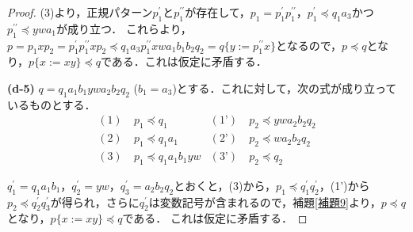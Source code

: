 \begin{proof}
(3)より，正規パターン$p_{1}^{\prime}$と$p_{1}^{\prime\prime}$が存在して，$p_{1}=p_{1}^{\prime}p_{1}^{\prime\prime}$，$p_{1}^{\prime} \preceq q_{1}a_{3}$かつ$p_{1}^{\prime\prime} \preceq ywa_{1}$が成り立つ．
これらより，$p=p_{1}xp_{2}=p_{1}^{\prime}p_{1}^{\prime\prime}xp_{2}\preceq q_{1}a_{3}p_{1}^{\prime\prime}xwa_{1}b_{1}b_{2}q_{2}=q \{ y := p_{1}^{\prime\prime}x \}$となるので，$p \preceq q$となり，$p \{ x := xy \} \preceq q$である．これは仮定に矛盾する．
\smallskip

\textbf{(d-5)} $q=q_{1}a_{1}b_{1}ywa_{2}b_{2}q_{2}$ ($b_{1}=a_{3}$)とする．これに対して，次の式が成り立っているものとする．
\begin{align*}
(1)~& p_{1} \preceq q_{1} & (\text{1'})~& p_{2} \preceq ywa_{2}b_{2}q_{2} \\
(2)~& p_{1} \preceq q_{1}a_{1} & (\text{2'})~& p_{2} \preceq wa_{2}b_{2}q_{2} \\
(3)~& p_{1} \preceq q_{1}a_{1}b_{1}yw & (\text{3'})~& p_{2} \preceq q_{2}
\end{align*}

$q_{1}^{\prime}=q_{1}a_{1}b_{1}$，$q_{2}^{\prime}=yw$，$q_{3}^{\prime}=a_{2}b_{2}q_{2}$とおくと，(3)から，$p_{1} \preceq q_{1}^{\prime}q_{2}^{\prime}$，(1')から$p_{2} \preceq q_{2}^{\prime}q_{3}^{\prime}$が得られ，さらに$q_{2}^{\prime}$は変数記号が含まれるので，補題\ref{補題9}より，$p \preceq q$となり，$p \{ x := xy \} \preceq q$である．
これは仮定に矛盾する．

\end{proof}

